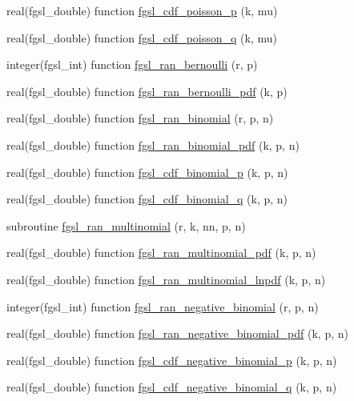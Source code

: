 \begin{DoxyCompactItemize}
\item 
real(fgsl\-\_\-double) function \hyperlink{rng_8finc_ab2613ed5965934db464cf780a49a7e4c}{fgsl\-\_\-cdf\-\_\-poisson\-\_\-p} (k, mu)
\item 
real(fgsl\-\_\-double) function \hyperlink{rng_8finc_a8cd213b3445aca4ba8cf6b25f12691ac}{fgsl\-\_\-cdf\-\_\-poisson\-\_\-q} (k, mu)
\item 
integer(fgsl\-\_\-int) function \hyperlink{rng_8finc_afd1f26e55ad5ea5baa69e3a2b7539361}{fgsl\-\_\-ran\-\_\-bernoulli} (r, p)
\item 
real(fgsl\-\_\-double) function \hyperlink{rng_8finc_a59759fbd2da5f1ba46671c1f88303305}{fgsl\-\_\-ran\-\_\-bernoulli\-\_\-pdf} (k, p)
\item 
real(fgsl\-\_\-double) function \hyperlink{rng_8finc_a4ee52af6322119ef765d429be9f24c33}{fgsl\-\_\-ran\-\_\-binomial} (r, p, n)
\item 
real(fgsl\-\_\-double) function \hyperlink{rng_8finc_a5ce6b40d19ba62b14e1603e821ea1eb1}{fgsl\-\_\-ran\-\_\-binomial\-\_\-pdf} (k, p, n)
\item 
real(fgsl\-\_\-double) function \hyperlink{rng_8finc_ab413ce31101954114fe2c271532c05da}{fgsl\-\_\-cdf\-\_\-binomial\-\_\-p} (k, p, n)
\item 
real(fgsl\-\_\-double) function \hyperlink{rng_8finc_a9a4484096d0c58e6b7f0f5994196c78c}{fgsl\-\_\-cdf\-\_\-binomial\-\_\-q} (k, p, n)
\item 
subroutine \hyperlink{rng_8finc_acdfa44ffb59d98ed7e61cacc5e7f2a3b}{fgsl\-\_\-ran\-\_\-multinomial} (r, k, nn, p, n)
\item 
real(fgsl\-\_\-double) function \hyperlink{rng_8finc_ab88e926552ce832524eb53539ce0dbc1}{fgsl\-\_\-ran\-\_\-multinomial\-\_\-pdf} (k, p, n)
\item 
real(fgsl\-\_\-double) function \hyperlink{rng_8finc_ab3574aeefea4cf7c0cf8b67dda605465}{fgsl\-\_\-ran\-\_\-multinomial\-\_\-lnpdf} (k, p, n)
\item 
integer(fgsl\-\_\-int) function \hyperlink{rng_8finc_ab25a0cc345a2b7acbac9430436e54362}{fgsl\-\_\-ran\-\_\-negative\-\_\-binomial} (r, p, n)
\item 
real(fgsl\-\_\-double) function \hyperlink{rng_8finc_aaf108cb550b6c3f7cc34cd7b12763b2f}{fgsl\-\_\-ran\-\_\-negative\-\_\-binomial\-\_\-pdf} (k, p, n)
\item 
real(fgsl\-\_\-double) function \hyperlink{rng_8finc_a907fcf3e4f47bf6af2cdf8c849925576}{fgsl\-\_\-cdf\-\_\-negative\-\_\-binomial\-\_\-p} (k, p, n)
\item 
real(fgsl\-\_\-double) function \hyperlink{rng_8finc_a9814ca89dedaa922543eb568e7060a9d}{fgsl\-\_\-cdf\-\_\-negative\-\_\-binomial\-\_\-q} (k, p, n)

\end{DoxyCompactItemize}
